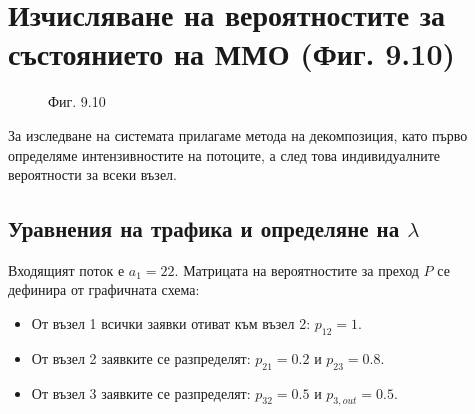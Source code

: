 \section{Изчисляване на вероятностите за състоянието на ММО (Фиг. 9.10)}
\begin{figure}
    \centering
    \caption{Фиг. 9.10}
\end{figure}
	За изследване на системата прилагаме метода на декомпозиция, като първо определяме интензивностите на потоците, а след това индивидуалните вероятности за всеки възел.
	
	\subsection{Уравнения на трафика и определяне на $\lambda$}
	Входящият поток е $a_1 = 22$. Матрицата на вероятностите за преход $P$ се дефинира от графичната схема:
	\begin{itemize}
		\item От възел 1 всички заявки отиват към възел 2: $p_{12} = 1$.
		\item От възел 2 заявките се разпределят: $p_{21} = 0.2$ и $p_{23} = 0.8$.
		\item От възел 3 заявките се разпределят: $p_{32} = 0.5$ и $p_{3,out} = 0.5$.
	\end{itemize}
	

